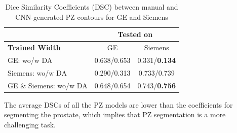 \begin{table}[h]
    \centering
    \begin{tabular}{|l|c|c|}
         \hline
          & \multicolumn{2}{c|}{ \textbf{Tested on} } \\
        \hline
         \textbf{Trained Width} &  GE & Siemens\\
         \hline
         GE: wo/w DA & 0.638/0.653& 0.331/\textbf{0.134} \\
         \hline
         Siemens: wo/w DA & 0.290/0.313 & 0.733/0.739\\
         \hline
         GE \& Siemens: wo/w DA & 0.648/0.654 & 0.743/\textbf{0.756}\\
         \hline
    \end{tabular}
    \caption{Dice Similarity Coefficients (DSC) between manual and CNN-generated 
    PZ contours for GE and Siemens}
    \label{tab:res_pz}
\end{table}

The average DSCs of all the PZ models are lower than the coefficients for 
segmenting the prostate, which implies that PZ segmentation is a more challenging task.

